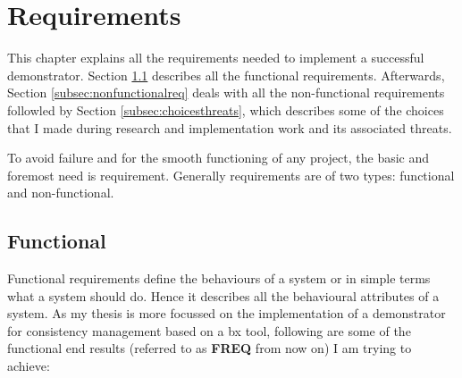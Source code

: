 \section{Requirements}\label{sec:requirements}
This chapter explains all the requirements needed to implement a successful demonstrator. Section \ref{subsec:functionalreq} describes all the functional requirements. Afterwards, Section \ref{subsec:nonfunctionalreq} deals with all the non-functional requirements followled by Section \ref{subsec:choicesthreats}, which describes some of the choices that I made during research and  implementation work and its associated threats. 

To avoid failure and for the smooth functioning of any project, the basic and foremost need is requirement. Generally requirements are of two types: functional and non-functional. 
\subsection{Functional}\label{subsec:functionalreq}
Functional requirements define the behaviours of a system or in simple terms what a system should do. Hence it describes all the behavioural attributes of a system.
\newline\newline As my thesis is more focussed on the implementation of a demonstrator for consistency management based on a bx tool, following are some of the functional end results (referred to as \textbf{FREQ} from now on) I am trying to achieve:

